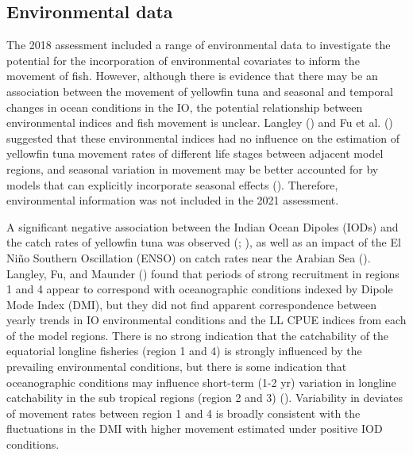 \documentclass[
]{scrartcl}
\begin{document}
\subsection{Environmental data}\label{environmental-data}

The 2018 assessment included a range of environmental data to
investigate the potential for the incorporation of environmental
covariates to inform the movement of fish. However, although there is
evidence that there may be an association between the movement of
yellowfin tuna and seasonal and temporal changes in ocean conditions in
the IO, the potential relationship between environmental indices and
fish movement is unclear. Langley
() and Fu et al.
() suggested that these
environmental indices had no influence on the estimation of yellowfin
tuna movement rates of different life stages between adjacent model
regions, and seasonal variation in movement may be better accounted for
by models that can explicitly incorporate seasonal effects
().
Therefore, environmental information was not included in the 2021
assessment.

A significant negative association between the Indian Ocean Dipoles
(IODs) and the catch rates of yellowfin tuna was observed
(; ), as well as an impact of the El Niño Southern Oscillation
(ENSO) on catch rates near the Arabian Sea
(). Langley, Fu, and Maunder
() found
that periods of strong recruitment in regions 1 and 4 appear to
correspond with oceanographic conditions indexed by Dipole Mode Index
(DMI), but they did not find apparent correspondence between yearly
trends in IO environmental conditions and the LL CPUE indices from each
of the model regions. There is no strong indication that the
catchability of the equatorial longline fisheries (region 1 and 4) is
strongly influenced by the prevailing environmental conditions, but
there is some indication that oceanographic conditions may influence
short-term (1-2 yr) variation in longline catchability in the sub
tropical regions (region 2 and 3)
(). Variability in deviates of movement rates between
region 1 and 4 is broadly consistent with the fluctuations in the DMI
with higher movement estimated under positive IOD conditions.
\end{document}
